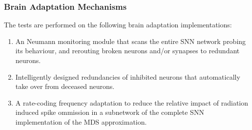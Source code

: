 \subsubsection{Brain Adaptation Mechanisms}\label{subsubsec:brain_adaptation_mechanisms}
The tests are performed on the following brain adaptation implementations:
\begin{enumerate}
    \item An Neumann monitoring module that scans the entire SNN network probing its behaviour, and rerouting broken neurons and/or synapses to redundant neurons.
    \item Intelligently designed redundancies of inhibited neurons that automatically take over from deceased neurons.
    \item A rate-coding frequency adaptation to reduce the relative impact of radiation induced spike ommission in a subnetwork of the complete SNN implementation of the MDS approximation.
\end{enumerate}